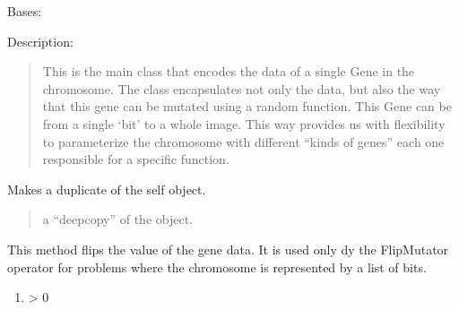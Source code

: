\documentclass[letterpaper,10pt,english]{sphinxmanual}
\begin{document}
\begin{fulllineitems}
\label{\detokenize{pygenalgo.genome:pygenalgo.genome.gene.Gene}}
\pysigstartsignatures
{}
\pysigstopsignatures
\sphinxAtStartPar
Bases: 

\sphinxAtStartPar
Description:
\begin{quote}

\sphinxAtStartPar
This is the main class that encodes the data of a single Gene in the chromosome.
The class encapsulates not only the data, but also the way that this gene can be
mutated using a random function. This Gene can be from a single ‘bit’ to a whole
image. This way provides us with flexibility to parameterize the chromosome with
different “kinds of genes” each one responsible for a specific function.
\end{quote}

\begin{fulllineitems}
\label{\detokenize{pygenalgo.genome:pygenalgo.genome.gene.Gene.clone}}
\pysigstartsignatures
{}
\pysigstopsignatures
\sphinxAtStartPar
Makes a duplicate of the self object.
\begin{quote}\begin{description}
\sphinxAtStartPar
a “deep\sphinxhyphen{}copy” of the object.

\end{description}\end{quote}

\end{fulllineitems}


\begin{fulllineitems}
\label{\detokenize{pygenalgo.genome:pygenalgo.genome.gene.Gene.flip}}
\pysigstartsignatures
{}
\pysigstopsignatures
\sphinxAtStartPar
This method flips the value of the gene data. It is used only dy the
FlipMutator operator for problems where the chromosome is represented
by a list of bits.
\begin{enumerate}
%
\item {} 
 \sphinxhyphen{}\textgreater{} 0


\end{enumerate}
\end{fulllineitems}
\end{fulllineitems}
\end{document}
